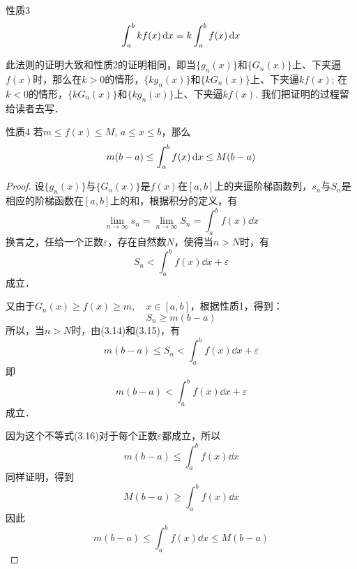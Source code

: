 \begin{blk}{性质3}
\[\displaystyle\int^b_a kf(x)\,{\rm d} x =k\displaystyle\int^b_a f(x)\,{\rm d} x \]
\end{blk}

此法则的证明大致和性质2的证明相同，即当$\{g_n(x)\}$和$\{G_n(x)\}$上、下夹逼$f(x)$时，那么在$k>0$的情形，$\{kg_n(x)\}$和$\{kG_n(x)\}$上、下夹逼$kf(x)$; 在$k<0$的情形，$\{kG_n(x)\}$和$\{kg_n(x)\}$上、下夹逼$kf(x)$. 我们把证明的过程留给读者去写．

\begin{blk}{性质4}
    若$m\le f(x)\le M$, $a\le x\le b$，那么
    \[m(b-a)\le \displaystyle\int^b_a f(x)\,{\rm d} x \le M(b-a) \]
    \end{blk}

\begin{proof}
    设$\{g_n(x)\}$与$\{G_n(x)\}$是$f(x)$在$[a,b]$上的夹逼阶梯函数列，$s_n$与$S_n$是相应的阶梯函数在$[a,b]$上的和，根据积分的定义，有
\[\lim_{n\to\infty}s_n=\lim_{n\to\infty}S_n=\int^b_a f(x)\dd x\]
换言之，任给一个正数$\varepsilon$，存在自然数$N$，使得当$n>N$时，有
\begin{equation}
    S_n<\int^b_a f(x)\dd x+\varepsilon
\end{equation}
成立．

又由于$G_n(x)\ge f(x)\ge m,\quad x\in[a,b]$，根据性质1，得到：
\begin{equation}
    S_n\ge m(b-a)
\end{equation}
所以，当$n>N$时，由(3.14)和(3.15)，有
\[m(b-a)\le S_n<\int^b_a f(x)\dd x+\varepsilon\]
即
\begin{equation}
    m(b-a)<\int^b_a f(x)\dd x+\varepsilon
\end{equation}
成立．

因为这个不等式(3.16)对于每个正数$\varepsilon$都成立，所以
\[m(b-a)\le \int^b_a f(x)\dd x\]
同样证明，得到
\[M(b-a)\ge \int^b_a f(x)\dd x\]
因此
\[m(b-a)\le \int^b_a f(x)\dd x\le M(b-a)\]
\end{proof}

\begin{figure}[htp]
    \centering
{}
    \caption{}\label{fig:chapter3_sec2_y=f(x)_bounded}
\end{figure}

